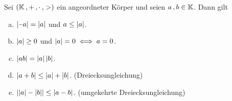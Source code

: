 \documentclass[../ana1.tex]{subfiles}
\begin{document}
\begin{satz}\label{satz:bgleichungen}
	Sei \((\mathbb{K} \operatorname{,} + \operatorname{,} \cdot \operatorname{,} >) \) ein angeordneter Körper und seien \(a \operatorname{,} b \in \mathbb{K} \). Dann gilt
	\begin{enumerate}[(a)]
		\item \(\abs{\minus a} = \abs{a} \) und \(a \leq \left|a\right| \).
		\item \(\left|a\right| \geq 0 \) und \(\left|a\right| = 0 \iff a = 0 \).
		\item \(\left|ab\right| = \left|a\right|\left|b\right| \).
		\item \(\left|a + b\right| \leq \left|a\right| + \left|b\right| \). (Dreiecksungleichung)
		\item \(\left|\left|a\right| - \left|b\right|\right| \leq \left|a - b\right| \). (umgekehrte Dreiecksungleichung)
	\end{enumerate}
\end{satz}
\end{document}
